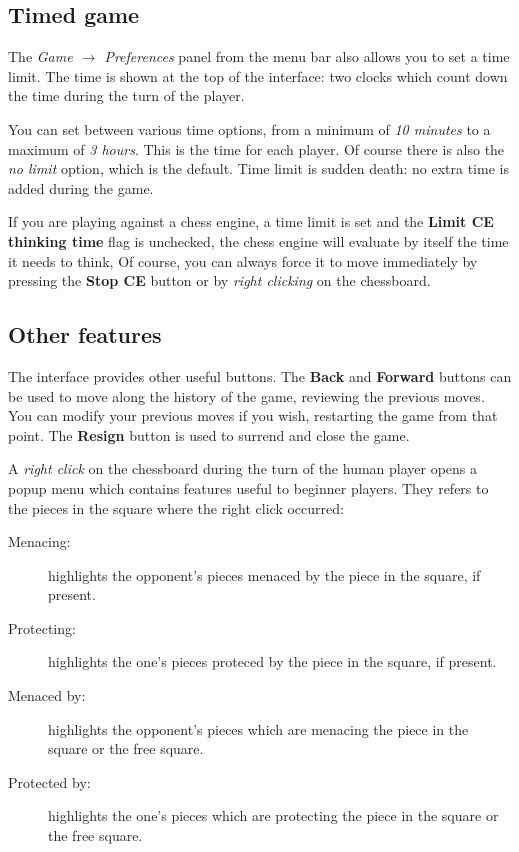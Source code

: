 \documentclass[a4paper]{article}
\begin{document}
\subsection{Timed game}
\label{time}
The \textit{Game $\rightarrow$ Preferences} panel from the menu bar also allows you to set a time limit. The time is shown at the top of the interface: two clocks
which count down the time during the turn of the player.

You can set between various time options, from a minimum of \textit{10 minutes} to a maximum of \textit{3 hours}. This is the time for each player. Of course there is
also the \textit{no limit} option, which is the default. Time limit is sudden death: no extra time is added during the game.

If you are playing against a chess engine, a time limit is set and the \textbf{Limit CE thinking time} flag is unchecked, the chess engine will evaluate by itself the time
it needs to think, Of course, you can always force it to move immediately by pressing the \textbf{Stop CE} button or by \textit{right clicking} on the chessboard.


\subsection{Other features}
The interface provides other useful buttons. The \textbf{Back} and \textbf{Forward} buttons can be used to move along the history of the game, reviewing the previous moves.
You can modify your previous moves if you wish, restarting the game from that point. The \textbf{Resign} button is used to surrend and close the game.

A \textit{right click} on the chessboard during the turn of the human player opens a popup menu which contains features useful to beginner players. They refers to the pieces
in the square where the right click occurred:
\begin{description}
\item[Menacing:] highlights the opponent's pieces menaced by the piece in the square, if present.
\item[Protecting:] highlights the one's pieces proteced by the piece in the square, if present.
\item[Menaced by:] highlights the opponent's pieces which are menacing the piece in the square or the free square.
\item[Protected by:] highlights the one's pieces which are protecting the piece in the square or the free square.
\end{description}
\end{document}
